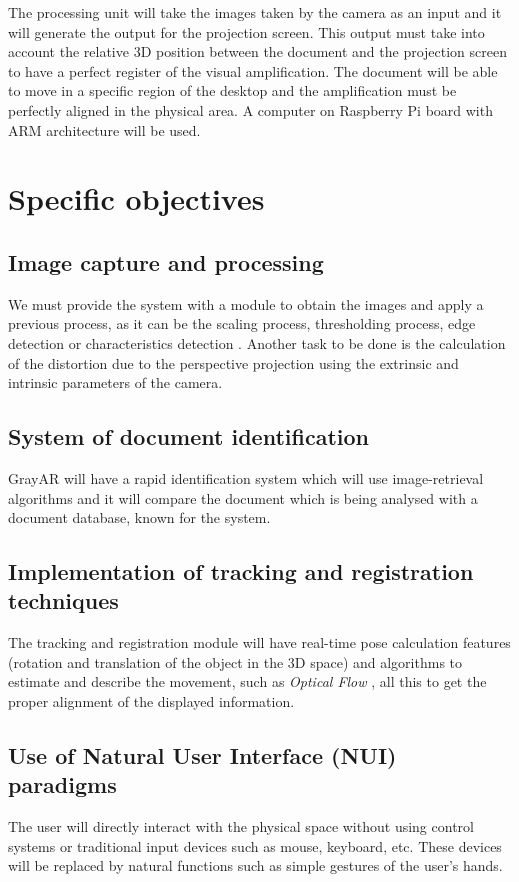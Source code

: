 The processing unit will take the images taken by the camera as an input and it will generate the output for the projection screen. This output must take into account the relative 3D position between the document and the projection screen to have a perfect register of the visual amplification. The document will be able to move in a specific region of the desktop and the amplification must be perfectly aligned in the physical area. A computer on Raspberry Pi board with ARM architecture will be used. 

\section{Specific objectives}
\subsection{Image capture and processing}
We must provide the system with a module to obtain the images and apply a previous process, as it can be the scaling process, thresholding process, edge detection or characteristics detection  \cite{Ortiz} \cite{Bay}. Another task to be done is the calculation of the distortion due to the perspective projection using the extrinsic and intrinsic parameters of the camera. 

\subsection{System of document identification}
GrayAR will have a rapid identification system which will use image-retrieval algorithms and it will compare the document which is being analysed with a document database, known for the system. 


\subsection{Implementation of tracking and registration techniques}
The tracking and registration module will have real-time pose calculation features (rotation and translation of the object in the 3D space) and algorithms to estimate and describe the movement, such as \textit{Optical Flow} \cite{LKanade}, all this to get the proper alignment of the displayed information.

\subsection{Use of Natural User Interface (NUI) paradigms}
The user will directly interact with the physical space without using control systems or traditional input devices such as mouse, keyboard, etc. These devices will be replaced by natural functions such as simple gestures of the user’s hands. 

